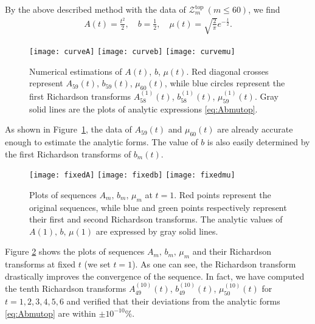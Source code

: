 \documentclass[11pt]{article}
\newcommand{\hf}{\frac{1}{2}}
\def\rt#1{\sqrt{#1}}
\newcommand{\Ztop}{\mathcal{Z}^{\text{top}}}
\renewcommand{\[}{\begin{eqnarray}}
\renewcommand{\]}{\end{eqnarray}}
\newcommand{\Atop}{A}
\newcommand{\btop}{b}
\newcommand{\mutop}{\mu}
\begin{document}
By the above described method with the data of $\Ztop_m\ (m\le 60)$,
we find
%
\begin{align}
 \Atop(t)=\frac{t^2}{2},\quad \btop=\hf,\quad
 \mutop(t)=\rt{\frac{2}{\pi}}e^{-\frac{t}{2}}.
\label{eq:Abmutop}
\end{align}
%
%
\begin{figure}[tb]
\begin{center}
\texttt{[image: curveA]}
\texttt{[image: curveb]}
\texttt{[image: curvemu]}
\end{center}
\vspace{-2ex}
\caption{Numerical estimations of $\Atop(t)$, $\btop$, $\mutop(t)$.
Red diagonal crosses represent
$\Atop_{59}(t)$, $\btop_{59}(t)$, $\mutop_{60}(t)$,
while blue circles represent the first Richardson transforms
$\Atop_{58}^{(1)}(t)$, $\btop_{58}^{(1)}(t)$, $\mutop_{59}^{(1)}(t)$.
Gray solid lines are the plots of analytic expressions
\eqref{eq:Abmutop}.}
\label{fig:curveAbmu}
\end{figure}
%
As shown in Figure~\ref{fig:curveAbmu},
the data of $\Atop_{59}(t)$ and $\mutop_{60}(t)$
are already accurate enough to estimate the analytic forms.
The value of $\btop$ is also easily determined
by the first Richardson transforms of $\btop_m(t)$.
%
\begin{figure}[tb]
\vspace{2ex}
\begin{center}
\texttt{[image: fixedA]}
\texttt{[image: fixedb]}
\texttt{[image: fixedmu]}
\end{center}
\vspace{-2ex}
\caption{Plots of sequences
$\Atop_m,\,\btop_m,\,\mutop_m$ at $t=1$.
Red points represent the original sequences,
while blue and green points respectively represent
their first and second Richardson transforms.
The analytic values of $\Atop(1),\,\btop,\,\mutop(1)$ are
expressed by gray solid lines.}
\label{fig:fixedAbmu}
\end{figure}
%
Figure \ref{fig:fixedAbmu} shows the plots
of sequences $\Atop_m,\,\btop_m,\,\mutop_m$
and their Richardson transforms
at fixed $t$ (we set $t=1$).
As one can see, the Richardson transform drastically
improves the convergence of the sequence.
In fact, we have computed the tenth Richardson transforms
$\Atop_{49}^{(10)}(t)$, $\btop_{49}^{(10)}(t)$,
$\mutop_{50}^{(10)}(t)$ for $t=1,2,3,4,5,6$
and verified that their deviations
from the analytic forms \eqref{eq:Abmutop}
are within $\pm 10^{-10}\%$.
\end{document}
